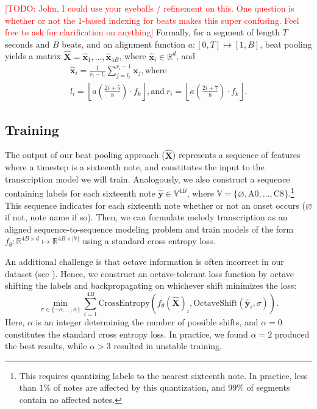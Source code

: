 \documentclass{article}
\newcommand{\todo}[1]{\textcolor{red}{[TODO: #1]}}
\begin{document}
\todo{John, I could use your eyeballs / refinement on this. One question is whether or not the 1-based indexing for beats makes this super confusing. Feel free to ask for clarification on anything}
Formally, for a segment of length $T$ seconds and $B$ beats, and an alignment function $a: [0, T] \mapsto [1, B]$, beat pooling yields a matrix $\hat{\bm{X}} = \hat{\bm{x}}_1, \ldots, \hat{\bm{x}}_{4B}$, where $\hat{\bm{x}}_i \in \mathbb{R}^d$, and
\begin{gather*}
\bm{\hat{x}}_i = \frac{1}{r_i - l_i} \sum_{j = l_i}^{r_i - 1} \bm{x}_j, \text{where} \\
l_i = \left\lfloor a \left(\frac{2i + 5}{8} \right) \cdot f_k \right\rfloor, \text{and}~
r_i = \left\lfloor a \left(\frac{2i + 7}{8} \right) \cdot f_k \right\rfloor.
\end{gather*}

\subsection{Training}

The output of our beat pooling approach ($\hat{\bm{X}}$) represents a sequence of features where a timestep is a sixteenth note, and constitutes the input to the transcription model we will train. 
Analogously, we also construct a sequence containing labels for each sixteenth note $\hat{\bm{y}} \in \mathbb{V}^{4B}$, where 
$\mathbb{V} = \{\varnothing, \text{A0}, \ldots, \text{C8}\}$.\footnote{This requires quantizing labels to the nearest sixteenth note. In practice, less than $1\%$ of notes are affected by this quantization, and $99\%$ of segments contain no affected notes.} 
This sequence indicates for each sixteenth note whether or not an onset occurs ($\varnothing$ if not, note name if so). 
Then, we can formulate melody transcription as an aligned sequence-to-sequence modeling problem and train models of the form $f_{\theta} : \mathbb{R}^{4B \times d} \mapsto \mathbb{R}^{4B \times |\mathbb{V}|}$ using a standard cross entropy loss. 

An additional challenge is that octave information is often incorrect in our dataset (see ). 
Hence, we construct an octave-tolerant loss function by octave shifting the labels and backpropagating on whichever shift minimizes the loss:
\begin{equation*}
\operatorname*{min}_{\sigma \in \{-\alpha, \ldots, \alpha\}} \sum_{i=1}^{4B} \text{CrossEntropy}(f_{\theta}(\bm{\hat{X}})_i, \text{OctaveShift}(\hat{\bm{y}}_i, \sigma)). 
\end{equation*}
Here, $\alpha$ is an integer determining the number of possible shifts, and $\alpha = 0$ constitutes the standard cross entropy loss. 
In practice, we found $\alpha = 2$ produced the best results, while $\alpha > 3$ resulted in unstable training.
\end{document}
